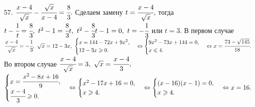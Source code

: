 57. $\cfrac{x-4}{\sqrt{x}}-\cfrac{\sqrt{x}}{x-4}=\cfrac{8}{3}.$ Сделаем замену $t=\cfrac{x-4}{\sqrt{x}},$ тогда $t-\cfrac{1}{t}=\cfrac{8}{3},\ t^2-1=\cfrac{8}{3}t,\
 t^2-\cfrac{8}{3}t-1=0,\ t=-\cfrac{1}{3}$ или $t=3.$ В первом случае $\cfrac{x-4}{\sqrt{x}}=-\cfrac{1}{3},\ \sqrt{x}=12-3x,\ \begin{cases} x=144-72x+9x^2,\\ 12-3x\geqslant0.\end{cases}\Leftrightarrow\begin{cases} 9x^2-73x+144=0,\\ x\leqslant4.\end{cases}\Leftrightarrow x=\cfrac{73-\sqrt{145}}{18}.$ Во втором случае $
\cfrac{x-4}{\sqrt{x}}=3,\ \sqrt{x}=\cfrac{x-4}{3},$\\$ \begin{cases} x=\cfrac{x^2-8x+16}{9},\\ \cfrac{x-4}{3}\geqslant0.\end{cases}\Leftrightarrow
\begin{cases} x^2-17x+16=0,\\ x\geqslant4.\end{cases}\Leftrightarrow\begin{cases} (x-16)(x-1)=0,\\ x\geqslant4.\end{cases}\Leftrightarrow x=16.$\\
